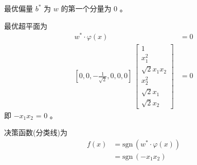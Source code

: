 	最优偏量 $b^*$ 为 $w$ 的第一个分量为 $0$ 。
	\par
	最优超平面为
	\begin{align*}
	 w^* \cdot \varphi(x) &= 0 \\
	 \left[ 0,0,-\frac{1}{\sqrt{2}},0,0,0 \right] \,
	\begin{bmatrix}
	1 \\
	x_1^2 \\
	\sqrt{2} x_1 x_2 \\
	x_2^2 \\
	\sqrt{2} x_1 \\
	\sqrt{2} x_2
	\end{bmatrix}
	&= 0
	\end{align*}
	即 $-x_1 x_2$ = 0 。
	\par
	决策函数(分类线)为
	\begin{align*}
	f(x) &= \mathrm{sgn} \, (w^* \cdot \varphi(x)) \\
	     &= \mathrm{sgn} \, (-x_1 x_2)
	\end{align*}






